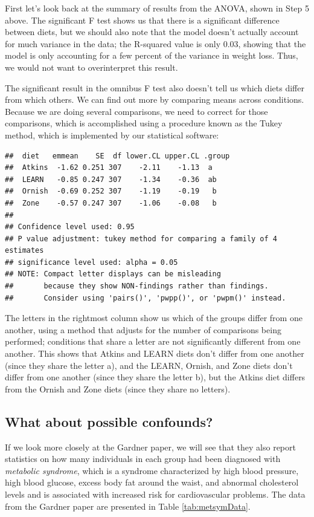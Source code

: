 \documentclass[
  12pt,
]{book}
\begin{document}
First let's look back at the summary of results from the ANOVA, shown in Step 5 above. The significant F test shows us that there is a significant difference between diets, but we should also note that the model doesn't actually account for much variance in the data; the R-squared value is only 0.03, showing that the model is only accounting for a few percent of the variance in weight loss. Thus, we would not want to overinterpret this result.

The significant result in the omnibus F test also doesn't tell us which diets differ from which others. We can find out more by comparing means across conditions. Because we are doing several comparisons, we need to correct for those comparisons, which is accomplished using a procedure known as the Tukey method, which is implemented by our statistical software:

\begin{verbatim}
##  diet   emmean    SE  df lower.CL upper.CL .group
##  Atkins  -1.62 0.251 307    -2.11    -1.13  a    
##  LEARN   -0.85 0.247 307    -1.34    -0.36  ab   
##  Ornish  -0.69 0.252 307    -1.19    -0.19   b   
##  Zone    -0.57 0.247 307    -1.06    -0.08   b   
## 
## Confidence level used: 0.95 
## P value adjustment: tukey method for comparing a family of 4 estimates 
## significance level used: alpha = 0.05 
## NOTE: Compact letter displays can be misleading
##       because they show NON-findings rather than findings.
##       Consider using 'pairs()', 'pwpp()', or 'pwpm()' instead.
\end{verbatim}

The letters in the rightmost column show us which of the groups differ from one another, using a method that adjusts for the number of comparisons being performed; conditions that share a letter are not significantly different from one another. This shows that Atkins and LEARN diets don't differ from one another (since they share the letter a), and the LEARN, Ornish, and Zone diets don't differ from one another (since they share the letter b), but the Atkins diet differs from the Ornish and Zone diets (since they share no letters).

\hypertarget{what-about-possible-confounds}{%
\subsection{What about possible confounds?}\label{what-about-possible-confounds}}

If we look more closely at the Gardner paper, we will see that they also report statistics on how many individuals in each group had been diagnosed with \emph{metabolic syndrome}, which is a syndrome characterized by high blood pressure, high blood glucose, excess body fat around the waist, and abnormal cholesterol levels and is associated with increased risk for cardiovascular problems. The data from the Gardner paper are presented in Table \ref{tab:metsymData}.
\end{document}
